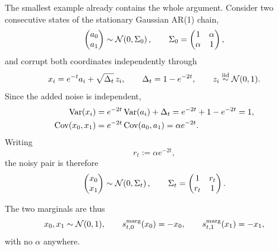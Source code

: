 The smallest example already contains the whole argument. Consider two
consecutive states of the stationary Gaussian AR(1) chain,
\begin{equation}
  \begin{pmatrix}a_0\\a_1\end{pmatrix}
  \sim
  \mathcal{N}\!\left(
    0,
    \Sigma_0
  \right),
  \qquad
  \Sigma_0
  =
  \begin{pmatrix}
    1 & \alpha\\
    \alpha & 1
  \end{pmatrix},
\end{equation}
and corrupt both coordinates independently through
\begin{equation}
  x_i=e^{-t}a_i+\sqrt{\Delta_t}\,z_i,
  \qquad
  \Delta_t=1-e^{-2t},
  \qquad
  z_i\stackrel{\mathrm{iid}}{\sim}\mathcal{N}(0,1).
\end{equation}
Since the added noise is independent,
\begin{align}
  \operatorname{Var}(x_i)
  &=e^{-2t}\operatorname{Var}(a_i)+\Delta_t
    =e^{-2t}+1-e^{-2t}=1,\\
  \operatorname{Cov}(x_0,x_1)
  &=e^{-2t}\operatorname{Cov}(a_0,a_1)
    =\alpha e^{-2t}.
\end{align}
Writing
\begin{equation}
  r_t:=\alpha e^{-2t},
\end{equation}
the noisy pair is therefore
\begin{equation}
  \begin{pmatrix}x_0\\x_1\end{pmatrix}
  \sim
  \mathcal{N}\!\left(
    0,
    \Sigma_t
  \right),
  \qquad
  \Sigma_t=
  \begin{pmatrix}
    1&r_t\\
    r_t&1
  \end{pmatrix}.
  \label{eq:dev-L2-cov}
\end{equation}

The two marginals are thus
\begin{equation}
  x_0,x_1\sim\mathcal{N}(0,1),
  \qquad
  s^{\mathrm{marg}}_{t,0}(x_0)=-x_0,
  \qquad
  s^{\mathrm{marg}}_{t,1}(x_1)=-x_1,
  \label{eq:dev-L2-marginal}
\end{equation}
with no $\alpha$ anywhere.

